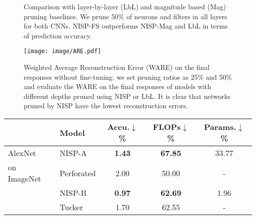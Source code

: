 \documentclass[10pt,twocolumn,letterpaper]{article}
\begin{document}
\begin{figure}[!t]
\centering    
{}
\caption{Comparison with layer-by-layer (LbL) and magnitude based (Mag) pruning baselines. We prune 50\% of neurons and filters in all layers for both CNNs. NISP-FS outperforms NISP-Mag and LbL in terms of prediction accuracy.}
\label{fig:maglbl}
\end{figure}\begin{figure}[t]
\begin{center}
   \texttt{[image: image/ARE.pdf]}
\end{center}
   \caption{Weighted Average Reconstruction Error (WARE) on the final responses without fine-tuning: we set pruning ratios as 25\% and 50\% and evaluate the WARE on the final responses of models with different depths pruned using NISP or LbL. It is clear that networks pruned by NISP have the lowest reconstruction errors.}
\label{fig:LBL}
\end{figure}\begin{table}[h]
\centering
\setlength{\tabcolsep}{4pt} 
\footnotesize
\begin{tabular}{@{}llccc@{}}
\toprule
                        & Model                           &
                        Accu.$\downarrow$\% & FLOPs$\downarrow$\% & Params.$\downarrow$\% \\ \midrule
\multirow{1}{*}{AlexNet }                 & NISP-A                          & \textbf{1.43}                          & \textbf{67.85}                         & 33.77                                        \\
\multirow{1}{*}{on ImageNet }& Perforated \cite{PerforatedCNN}         & 2.00                          & 50.00                         & -                                         \\\cmidrule{2-5}
                        & NISP-B                       & \textbf{0.97}                          & \textbf{62.69}                         & 1.96                                       \\
                        & Tucker \cite{Tucker}                & 1.70                          & 62.55                         & -                                        \\\cmidrule{2-5}

\end{tabular}
\end{table}
\end{document}
